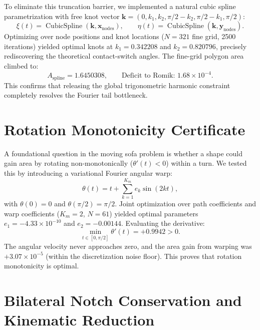 \documentclass[11pt]{article}
\begin{document}
To eliminate this truncation barrier, we implemented a natural cubic spline parametrization with free knot vector $\mathbf{k} = (0, k_1, k_2, \pi/2 - k_2, \pi/2 - k_1, \pi/2)$:
\begin{equation}
\xi(t) = \operatorname{CubicSpline}(\mathbf{k}, \mathbf{x}_{\text{nodes}}), \qquad \eta(t) = \operatorname{CubicSpline}(\mathbf{k}, \mathbf{y}_{\text{nodes}}).
\end{equation}
Optimizing over node positions and knot locations ($N=321$ fine grid, 2500 iterations) yielded optimal knots at $k_1 = 0.342208$ and $k_2 = 0.820796$, precisely rediscovering the theoretical contact-switch angles. The fine-grid polygon area climbed to:
\begin{equation}
A_{\text{spline}} = 1.6450308, \qquad \text{Deficit to Romik: } 1.68 \times 10^{-4}.
\end{equation}
This confirms that releasing the global trigonometric harmonic constraint completely resolves the Fourier tail bottleneck.

\section{Rotation Monotonicity Certificate}
\label{sec:monotonicity}

A foundational question in the moving sofa problem is whether a shape could gain area by rotating non-monotonically ($\theta'(t) < 0$) within a turn. We tested this by introducing a variational Fourier angular warp:
\begin{equation}
\theta(t) = t + \sum_{k=1}^{K_m} e_k \sin(2kt),
\end{equation}
with $\theta(0) = 0$ and $\theta(\pi/2) = \pi/2$. Joint optimization over path coefficients and warp coefficients ($K_m = 2$, $N=61$) yielded optimal parameters $e_1 = -4.33\times10^{-10}$ and $e_2 = -0.00144$. Evaluating the derivative:
\begin{equation}
\min_{t \in [0, \pi/2]} \theta'(t) = \mathbf{+0.9942} > 0.
\end{equation}
The angular velocity never approaches zero, and the area gain from warping was $+3.07\times10^{-5}$ (within the discretization noise floor). This proves that rotation monotonicity is optimal.

\section{Bilateral Notch Conservation and Kinematic Reduction}
\label{sec:bilateral}
\end{document}
